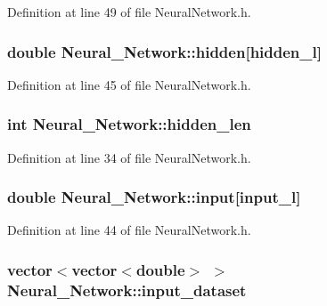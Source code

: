 Definition at line 49 of file Neural\-Network.\-h.

\hypertarget{a00003_a5b31deacdc5c63e687d6ebc086b761ab}{
\subsubsection[{hidden}]{\setlength{\rightskip}{0pt plus 5cm}double Neural\-\_\-\-Network\-::hidden\mbox{[}{\bf hidden\-\_\-l}\mbox{]}\hspace{0.3cm}{\ttfamily [private]}}}\label{d1/d7c/a00003_a5b31deacdc5c63e687d6ebc086b761ab}


Definition at line 45 of file Neural\-Network.\-h.

\hypertarget{a00003_a71cc8ca03da47fe639dd1e8ed518069c}{
\subsubsection[{hidden\-\_\-len}]{\setlength{\rightskip}{0pt plus 5cm}int Neural\-\_\-\-Network\-::hidden\-\_\-len\hspace{0.3cm}{\ttfamily [private]}}}\label{d1/d7c/a00003_a71cc8ca03da47fe639dd1e8ed518069c}


Definition at line 34 of file Neural\-Network.\-h.

\hypertarget{a00003_a347a1fceb1ac048ecd913a89126cebb3}{
\subsubsection[{input}]{\setlength{\rightskip}{0pt plus 5cm}double Neural\-\_\-\-Network\-::input\mbox{[}{\bf input\-\_\-l}\mbox{]}\hspace{0.3cm}{\ttfamily [private]}}}\label{d1/d7c/a00003_a347a1fceb1ac048ecd913a89126cebb3}


Definition at line 44 of file Neural\-Network.\-h.

\hypertarget{a00003_a81bab51b36643c5b10ba25d518c27ff3}{
\subsubsection[{input\-\_\-dataset}]{\setlength{\rightskip}{0pt plus 5cm}vector$<$vector$<$double$>$ $>$ Neural\-\_\-\-Network\-::input\-\_\-dataset\hspace{0.3cm}{\ttfamily [private]}}}\label{d1/d7c/a00003_a81bab51b36643c5b10ba25d518c27ff3}


